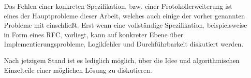 \label{section:spezifikation}
Das Fehlen einer konkreten Spezifikation, bzw. einer Protokollerweiterung ist eines der Hauptprobleme dieser Arbeit, welches auch einige der vorher genannten Probleme mit einschließt. Erst wenn eine vollständige Spezifikation, beispielsweise in Form eines RFC, vorliegt, kann auf konkreter Ebene über Implementierungsprobleme, Logikfehler und Durchführbarkeit diskutiert werden.

Nach jetzigem Stand ist es lediglich möglich, über die Idee und algorithmischen Einzelteile einer möglichen Lösung zu diskutieren.

